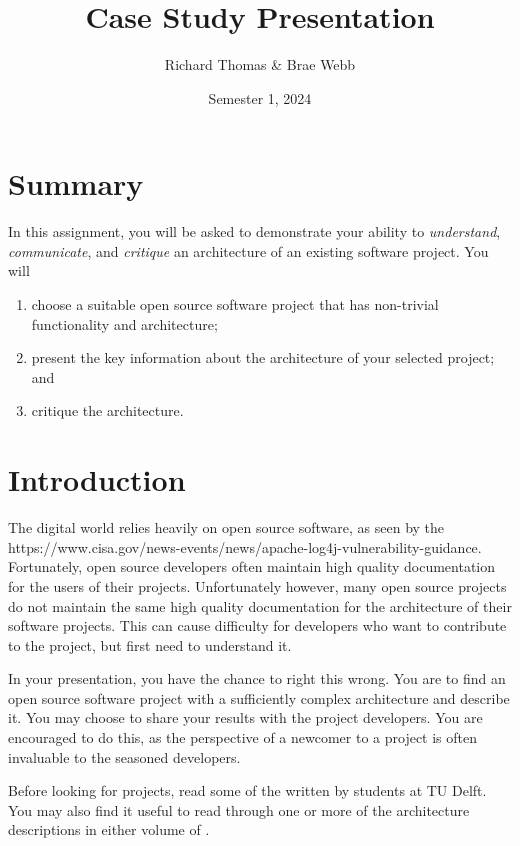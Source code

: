 \documentclass{csse4400}
\title{Case Study Presentation}
\author{Richard Thomas \& Brae Webb}
\date{Semester 1, 2024}
\begin{document}

\maketitle

\section*{Summary}
In this assignment, you will be asked to demonstrate your ability to
\textsl{understand}, \textsl{communicate}, and \textsl{critique} an architecture of an existing software project.
You will
\begin{enumerate}
    \item choose a suitable open source software project that has non-trivial functionality and architecture;
    \item present the key information about the architecture of your selected project; and
    \item critique the architecture.
\end{enumerate}


\section{Introduction}
The digital world relies heavily on open source software, as seen by the 
{https://www.cisa.gov/news-events/news/apache-log4j-vulnerability-guidance}.
Fortunately, open source developers often maintain high quality documentation for the users of their projects.
Unfortunately however, many open source projects do not maintain the same high quality documentation
for the architecture of their software projects. This can cause difficulty for developers who want to
contribute to the project, but first need to understand it.

In your presentation, you have the chance to right this wrong.
You are to find an open source software project with a sufficiently complex architecture and describe it.
You may choose to share your results with the project developers.
You are encouraged to do this, as the perspective of a newcomer to a project is often invaluable to the seasoned developers.

Before looking for projects, read some of the 
 written by students at TU Delft.
You may also find it useful to read through one or more of the architecture descriptions in either volume of
.
\end{document}
